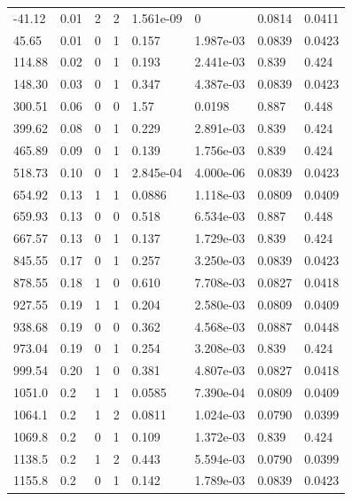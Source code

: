 \documentclass[preview]{standalone}
\begin{document}
{{\begin{tabular}{L{1.2cm}C{1.2cm} C{0.3cm}C{0.5cm} C{1.4cm}C{1.4cm} C{1.4cm}C{1.4cm}}
  -41.12  &  0.01  & 2     &  2 &  1.561e-09  & 0  & 0.0814 &  0.0411   \\ 
  45.65  &  0.01  & 0     &  1 &  0.157  & 1.987e-03  & 0.0839 &  0.0423   \\ 
  114.88  &  0.02  & 0     &  1 &  0.193  & 2.441e-03  & 0.839 &  0.424   \\ 
  148.30  &  0.03  & 0     &  1 &  0.347  & 4.387e-03  & 0.0839 &  0.0423   \\ 
  300.51  &  0.06  & 0     &  0 &  1.57  & 0.0198  & 0.887 &  0.448   \\ 
  399.62  &  0.08  & 0     &  1 &  0.229  & 2.891e-03  & 0.839 &  0.424   \\ 
  465.89  &  0.09  & 0     &  1 &  0.139  & 1.756e-03  & 0.839 &  0.424   \\ 
  518.73  &  0.10  & 0     &  1 &  2.845e-04  & 4.000e-06  & 0.0839 &  0.0423   \\ 
  654.92  &  0.13  & 1     &  1 &  0.0886  & 1.118e-03  & 0.0809 &  0.0409   \\ 
  659.93  &  0.13  & 0     &  0 &  0.518  & 6.534e-03  & 0.887 &  0.448   \\ 
  667.57  &  0.13  & 0     &  1 &  0.137  & 1.729e-03  & 0.839 &  0.424   \\ 
  845.55  &  0.17  & 0     &  1 &  0.257  & 3.250e-03  & 0.0839 &  0.0423   \\ 
  878.55  &  0.18  & 1     &  0 &  0.610  & 7.708e-03  & 0.0827 &  0.0418   \\ 
  927.55  &  0.19  & 1     &  1 &  0.204  & 2.580e-03  & 0.0809 &  0.0409   \\ 
  938.68  &  0.19  & 0     &  0 &  0.362  & 4.568e-03  & 0.0887 &  0.0448   \\ 
  973.04  &  0.19  & 0     &  1 &  0.254  & 3.208e-03  & 0.839 &  0.424   \\ 
  999.54  &  0.20  & 1     &  0 &  0.381  & 4.807e-03  & 0.0827 &  0.0418   \\ 
  1051.0  &   0.2  & 1     &  1 &  0.0585  & 7.390e-04  & 0.0809 &  0.0409   \\ 
  1064.1  &   0.2  & 1     &  2 &  0.0811  & 1.024e-03  & 0.0790 &  0.0399   \\ 
  1069.8  &   0.2  & 0     &  1 &  0.109  & 1.372e-03  & 0.839 &  0.424   \\ 
  1138.5  &   0.2  & 1     &  2 &  0.443  & 5.594e-03  & 0.0790 &  0.0399   \\ 
  1155.8  &   0.2  & 0     &  1 &  0.142  & 1.789e-03  & 0.0839 &  0.0423   \\ 

\end{tabular}}}
\end{document}
